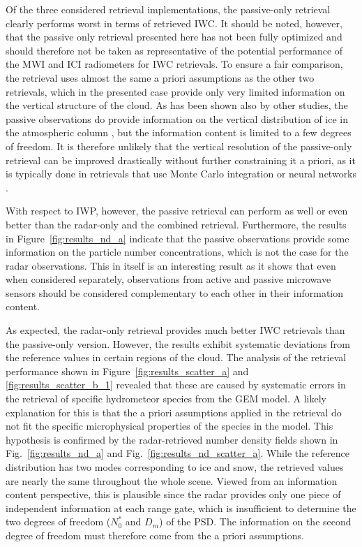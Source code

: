 \documentclass[journal abbreviation, manuscript]{copernicus}
\begin{document}
Of the three considered retrieval implementations, the passive-only retrieval
clearly performs worst in terms of retrieved IWC. It should be noted, however,
that the passive only retrieval presented here has not been fully optimized and
should therefore not be taken as representative of the potential performance of
the MWI and ICI radiometers for IWC retrievals. To ensure a fair comparison, the
retrieval uses almost the same a priori assumptions as the other two retrievals,
which in the presented case provide only very limited information on the
vertical structure of the cloud. As has been shown also by other studies, the
passive observations do provide information on the vertical distribution of ice
in the atmospheric column \citep{wang17, grutzun18}, but the information content
is limited to a few degrees of freedom. It is therefore unlikely that the
vertical resolution of the passive-only retrieval can be improved drastically
without further constraining it a priori, as it is typically done in retrievals
that use Monte Carlo integration or neural networks \citep{pfreundschuh18}.

With respect to IWP, however, the passive retrieval can perform as well or even
better than the radar-only and the combined retrieval. Furthermore, the results
in Figure~\ref{fig:results_nd_a} indicate that the passive observations provide
some information on the particle number concentrations, which is not the case
for the radar observations. This in itself is an interesting result as it shows
that even when considered separately, observations from active and passive
microwave sensors should be considered complementary to each other in their
information content.

As expected, the radar-only retrieval provides much better IWC retrievals than
the passive-only version. However, the results exhibit systematic deviations
from the reference values in certain regions of the cloud. The analysis of the
retrieval performance shown in Figure~\ref{fig:results_scatter_a}
 and \ref{fig:results_scatter_b_1} revealed that
these are caused by systematic errors in the retrieval of specific hydrometeor
species from the GEM model. A likely explanation for this is that the a priori
assumptions applied in the retrieval do not fit the specific microphysical
properties of the species in the model. This hypothesis is confirmed by the
radar-retrieved number density fields shown in Fig.~\ref{fig:results_nd_a} and
Fig.~\ref{fig:results_nd_scatter_a}. While the reference distribution has two
modes corresponding to ice and snow, the retrieved values are nearly the same
throughout the whole scene. Viewed from an information content perspective, this
is plausible since the radar provides only one piece of independent information
at each range gate, which is insufficient to determine the two degrees of
freedom ($N_0^*$ and $D_m$) of the PSD. The information on the second degree of
freedom must therefore come from the a priori assumptions.
\end{document}
